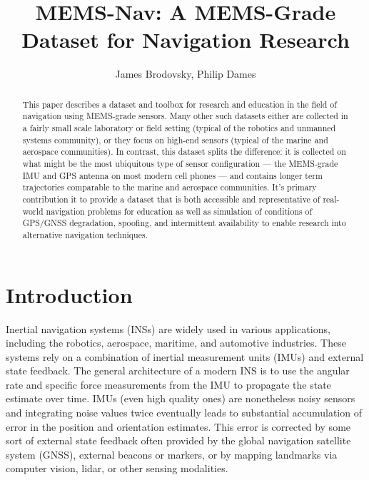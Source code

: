 \documentclass[Afour,sageh,times]{sagej}
\begin{document}

\title{MEMS-Nav: A MEMS-Grade Dataset for Navigation Research}
\author{James Brodovsky, Philip Dames }

\begin{abstract}
This paper describes a dataset and toolbox for research and education in the field of navigation using MEMS-grade sensors. Many other such datasets either are collected in a fairly small scale laboratory or field setting (typical of the robotics and unmanned systems community), or they focus on high-end sensors (typical of the marine and aerospace communities). In contrast, this dataset splits the difference: it is collected on what might be the most ubiquitous type of sensor configuration --- the MEMS-grade IMU and GPS antenna on most modern cell phones --- and contains longer term trajectories comparable to the marine and aerospace communities. It's primary contribution it to provide a dataset that is both accessible and representative of real-world navigation problems for education as well as simulation of conditions of GPS/GNSS degradation, spoofing, and intermittent availability to enable research into alternative navigation techniques.
\end{abstract}

\maketitle
\section{Introduction}
Inertial navigation systems (INSs) are widely used in various applications, including the robotics, aerospace, maritime, and automotive industries. These systems rely on a combination of inertial measurement units (IMUs) and external state feedback. The general architecture of a modern INS is to use the angular rate and specific force measurements from the IMU to propagate the state estimate over time. IMUs (even high quality ones) are nonetheless noisy sensors and integrating noise values twice eventually leads to substantial accumulation of error in the position and orientation estimates. This error is corrected by some sort of external state feedback often provided by the global navigation satellite system (GNSS), external beacons or markers, or by mapping landmarks via computer vision, lidar, or other sensing modalities. 
\end{document}
